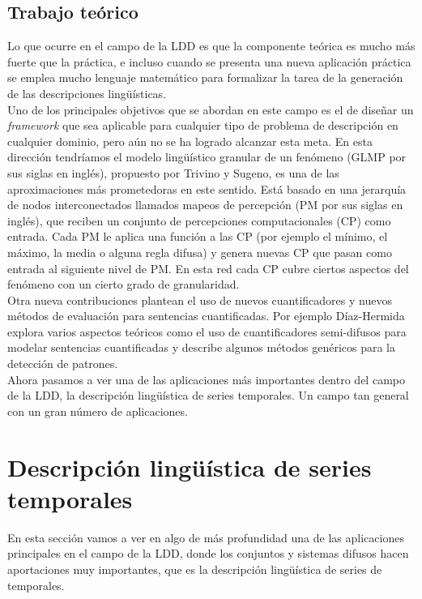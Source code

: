 \documentclass[10pt,a4paper]{article}
\begin{document}
\subsection{Trabajo teórico}

Lo que ocurre en el campo de la LDD es que la componente teórica es mucho más fuerte que la práctica, e incluso cuando se presenta una nueva aplicación práctica se emplea mucho lenguaje matemático para formalizar la tarea de la generación de las descripciones lingüísticas.\\

Uno de los principales objetivos que se abordan en este campo es el de diseñar un \textit{framework} que sea aplicable para cualquier tipo de problema de descripción en cualquier dominio, pero aún no se ha logrado alcanzar esta meta. En esta dirección tendríamos el modelo lingüístico granular de un fenómeno (GLMP por sus siglas en inglés), propuesto por Trivino y Sugeno, es una de las aproximaciones más prometedoras en este sentido. Está basado en una jerarquía de nodos interconectados llamados mapeos de percepción (PM por sus siglas en inglés), que reciben un conjunto de percepciones computacionales (CP) como entrada. Cada PM le aplica una función a las CP (por ejemplo el mínimo, el máximo, la media o alguna regla difusa) y genera nuevas CP que pasan como entrada al siguiente nivel de PM. En esta red cada CP cubre ciertos aspectos del fenómeno con un cierto grado de granularidad.\\

Otra nueva contribuciones plantean el uso de nuevos cuantificadores y nuevos métodos de evaluación para sentencias cuantificadas. Por ejemplo Díaz-Hermida explora varios aspectos teóricos como el uso de cuantificadores semi-difusos para modelar sentencias cuantificadas y describe algunos métodos genéricos para la detección de patrones.\\

Ahora pasamos a ver una de las aplicaciones más importantes dentro del campo de la LDD, la descripción lingüística de series temporales. Un campo tan general con un gran número de aplicaciones.

\section{Descripción lingüística de series temporales}

En esta sección vamos a ver en algo de más profundidad una de las aplicaciones principales en el campo de la LDD, donde los conjuntos y sistemas difusos hacen aportaciones muy importantes, que es la descripción lingüística de series de temporales.\\
\end{document}
